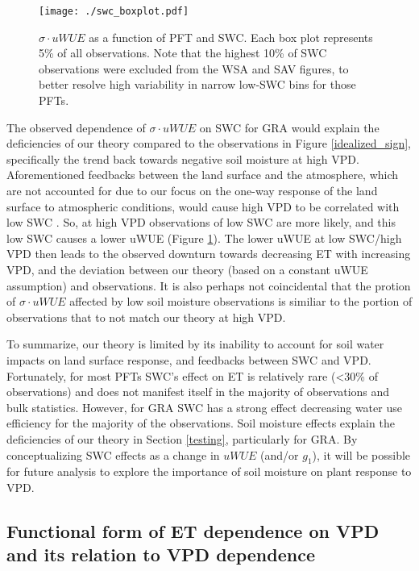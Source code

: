 \documentclass[draft,linenumbers]{agujournal}
\begin{document}
\begin{figure}
\centering
\centerline{\texttt{[image: ./swc\_boxplot.pdf]}}
\caption{$\sigma \cdot uWUE$ as a function of PFT and SWC. Each box plot represents 5\% of all observations. Note that the highest 10\% of SWC observations were excluded from the WSA and SAV figures, to better resolve high variability in narrow low-SWC bins for those PFTs.}
\label{swc_boxplot}
\end{figure}

The observed dependence of $\sigma \cdot uWUE$ on SWC for GRA would explain the deficiencies of our theory compared to the observations in Figure \ref{idealized_sign}, specifically the trend back towards negative soil moisture at high VPD. Aforementioned feedbacks between the land surface and the atmosphere, which are not accounted for due to our focus on the one-way response of the land surface to atmospheric conditions, would cause high VPD to be correlated with low SWC \citep[][]{Gentine_2016, Berg_2016}. So, at high VPD observations of low SWC are more likely, and this low SWC causes a lower uWUE (Figure \ref{swc_boxplot}). The lower uWUE at low SWC/high VPD then leads to the observed downturn towards decreasing ET with increasing VPD, and the deviation between our theory (based on a constant uWUE assumption) and observations. It is also perhaps not coincidental that the protion of $\sigma \cdot uWUE$ affected by low soil moisture observations is similiar to the portion of observations that to not match our theory at high VPD.

To summarize, our theory is limited by its inability to account for soil water impacts on land surface response, and feedbacks between SWC and VPD. Fortunately, for most PFTs SWC's effect on ET is relatively rare (<30\% of observations) and does not manifest itself in the majority of observations and bulk statistics. However, for GRA SWC has a strong effect decreasing water use efficiency for the majority of the observations. Soil moisture effects explain the deficiencies of our theory in Section \ref{testing}, particularly for GRA. By conceptualizing SWC effects as a change in $uWUE$ (and/or $g_1$), it will be possible for future analysis to explore the importance of soil moisture on plant response to VPD.

\subsection{Functional form of ET dependence on VPD and its relation to VPD dependence}
\end{document}
